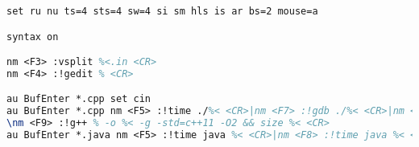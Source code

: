 \begin{lstlisting}[language=tex,identifierstyle=\color{black},commentstyle=\color{black}]
set ru nu ts=4 sts=4 sw=4 si sm hls is ar bs=2 mouse=a

syntax on

nm <F3> :vsplit %<.in <CR>
nm <F4> :!gedit % <CR>

au BufEnter *.cpp set cin
au BufEnter *.cpp nm <F5> :!time ./%< <CR>|nm <F7> :!gdb ./%< <CR>|nm <F8> :!time ./%< < %<.in <CR>|
\nm <F9> :!g++ % -o %< -g -std=c++11 -O2 && size %< <CR>
au BufEnter *.java nm <F5> :!time java %< <CR>|nm <F8> :!time java %< < %<.in|nm <F9> :!javac % <CR>
\end{lstlisting}

